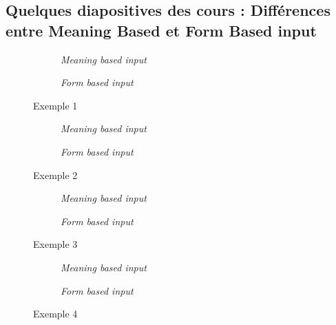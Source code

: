 \documentclass[output=paper]{langscibook}
\begin{document}
\begin{otherlanguage}{french}
\begin{paperappendix}
%
%
%


\section{Quelques diapositives des cours : Différences entre Meaning Based et Form Based input}

\begin{figure}[H]
\begin{subfigure}{.5\textwidth}\centering
{}
\caption{\textit{Meaning based input}}
\end{subfigure}\begin{subfigure}{.5\textwidth}\centering
{}
\caption{\textit{Form based input}}
\end{subfigure}
\caption{Exemple 1}
\end{figure}\clearpage

\begin{figure}[H]
\begin{subfigure}{.45\textwidth}\centering
{}
\caption{\textit{{Meaning based input}}}
\end{subfigure}\begin{subfigure}{.45\textwidth}\centering
{}
\caption{\textit{Form based input}}
\end{subfigure}
\caption{Exemple 2}
\end{figure}\largerpage[2]
\begin{figure}[H]
\begin{subfigure}{.45\textwidth}\centering
{}
\caption{\textit{Meaning based input}}
\end{subfigure}\begin{subfigure}{.45\textwidth}\centering
{}
\caption{\textit{Form based input}}
\end{subfigure}
\caption{Exemple 3}
\end{figure}
\begin{figure}[H]
\begin{subfigure}{.45\textwidth}\centering
{}
\caption{\textit{Meaning based input}}
\end{subfigure}\begin{subfigure}{.45\textwidth}\centering
{}
\caption{\textit{Form based input}}
\end{subfigure}
\caption{Exemple 4}
\end{figure}


\end{paperappendix}
\end{otherlanguage}
\end{document}
